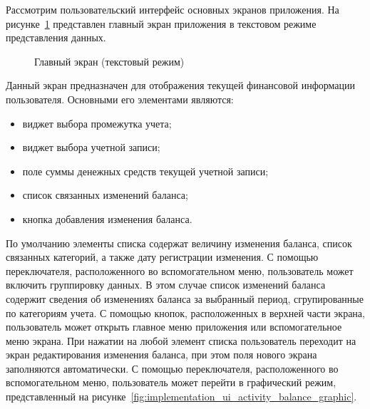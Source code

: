 Рассмотрим пользовательский интерфейс основных экранов приложения.
На рисунке~\ref{fig:implementation_ui_activity_balance_text}
представлен главный экран приложения в
текстовом режиме представления данных.

\begin{figure}[h!]
  \centering
  \caption{Главный экран (текстовый режим)}
  \label{fig:implementation_ui_activity_balance_text}
\end{figure}

Данный экран предназначен для отображения текущей финансовой
информации пользователя. Основными его элементами являются:
\begin{itemize}
\item виджет выбора промежутка учета;
\item виджет выбора учетной записи;
\item поле суммы денежных средств текущей учетной записи;
\item список связанных изменений баланса;
\item кнопка добавления изменения баланса.
\end{itemize}

По умолчанию элементы списка содержат величину изменения баланса,
список связанных категорий, а также дату регистрации изменения.
С помощью переключателя, расположенного во вспомогательном меню,
пользователь может включить группировку данных.
В этом случае список изменений баланса содержит сведения
об изменениях баланса за выбранный период,
сгрупированные по категориям учета.
С помощью кнопок, расположенных в верхней части экрана, пользователь
может открыть главное меню приложения или вспомогательное меню экрана.
При нажатии на любой элемент списка пользователь переходит
на экран редактирования изменения баланса,
при этом поля нового экрана заполняются автоматически.
С помощью переключателя, расположенного во вспомогательном меню,
пользователь может перейти в графический режим, представленный
на рисунке~\ref{fig:implementation_ui_activity_balance_graphic}.

